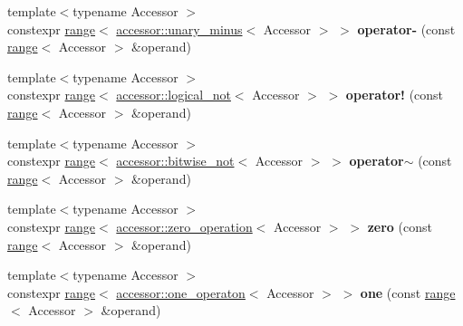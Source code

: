 \begin{DoxyCompactItemize}
\item 
\mbox{\label{namespacegko_acdb7f55a089dea8a02ce13d570894253}} 
{\footnotesize template$<$typename Accessor $>$ }\\constexpr \hyperlink{classgko_1_1range}{range}$<$ \hyperlink{structgko_1_1accessor_1_1unary__minus}{accessor\+::unary\+\_\+minus}$<$ Accessor $>$ $>$ {\bfseries operator-\/} (const \hyperlink{classgko_1_1range}{range}$<$ Accessor $>$ \&operand)
\item 
\mbox{\label{namespacegko_a1b0174e1e36ef6c8561108174e35a1b6}} 
{\footnotesize template$<$typename Accessor $>$ }\\constexpr \hyperlink{classgko_1_1range}{range}$<$ \hyperlink{structgko_1_1accessor_1_1logical__not}{accessor\+::logical\+\_\+not}$<$ Accessor $>$ $>$ {\bfseries operator!} (const \hyperlink{classgko_1_1range}{range}$<$ Accessor $>$ \&operand)
\item 
\mbox{\label{namespacegko_a69778756c37d99881afbd0ec6203db60}} 
{\footnotesize template$<$typename Accessor $>$ }\\constexpr \hyperlink{classgko_1_1range}{range}$<$ \hyperlink{structgko_1_1accessor_1_1bitwise__not}{accessor\+::bitwise\+\_\+not}$<$ Accessor $>$ $>$ {\bfseries operator$\sim$} (const \hyperlink{classgko_1_1range}{range}$<$ Accessor $>$ \&operand)
\item 
\mbox{\label{namespacegko_ae6313c0993fea961ebefddb393ab937d}} 
{\footnotesize template$<$typename Accessor $>$ }\\constexpr \hyperlink{classgko_1_1range}{range}$<$ \hyperlink{structgko_1_1accessor_1_1zero__operation}{accessor\+::zero\+\_\+operation}$<$ Accessor $>$ $>$ {\bfseries zero} (const \hyperlink{classgko_1_1range}{range}$<$ Accessor $>$ \&operand)
\item 
\mbox{\label{namespacegko_a314483c618b92c78dc6ac2e978ad4529}} 
{\footnotesize template$<$typename Accessor $>$ }\\constexpr \hyperlink{classgko_1_1range}{range}$<$ \hyperlink{structgko_1_1accessor_1_1one__operaton}{accessor\+::one\+\_\+operaton}$<$ Accessor $>$ $>$ {\bfseries one} (const \hyperlink{classgko_1_1range}{range}$<$ Accessor $>$ \&operand)
\item 
\mbox{\label{namespacegko_a1affadd93ed2a2b867d5aeff319e8922}} 

\end{DoxyCompactItemize}
